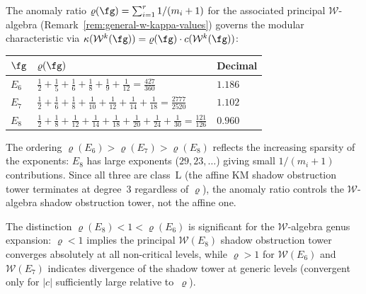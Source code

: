 \begin{remark}%
\label{rem:exceptional-anomaly-ratio}
The anomaly ratio
$\varrho(\fg) = \sum_{i=1}^r 1/(m_i + 1)$
for the associated principal $\mathcal{W}$-algebra
(Remark~\textup{\ref{rem:general-w-kappa-values}})
governs the modular characteristic via
$\kappa(\mathcal{W}^k(\fg)) = \varrho(\fg) \cdot c(\mathcal{W}^k(\fg))$:
\begin{center}
\renewcommand{\arraystretch}{1.3}
\begin{tabular}{lll}
\toprule
$\fg$ & $\varrho(\fg)$ & Decimal \\
\midrule
$E_6$ & $\displaystyle\frac{1}{2} + \frac{1}{5} + \frac{1}{6}
 + \frac{1}{8} + \frac{1}{9} + \frac{1}{12}
 = \frac{427}{360}$ & $1.186$ \\[6pt]
$E_7$ & $\displaystyle\frac{1}{2} + \frac{1}{6} + \frac{1}{8}
 + \frac{1}{10} + \frac{1}{12} + \frac{1}{14} + \frac{1}{18}
 = \frac{2777}{2520}$ & $1.102$ \\[6pt]
$E_8$ & $\displaystyle\frac{1}{2} + \frac{1}{8} + \frac{1}{12}
 + \frac{1}{14} + \frac{1}{18} + \frac{1}{20} + \frac{1}{24}
 + \frac{1}{30}
 = \frac{121}{126}$ & $0.960$ \\
\bottomrule
\end{tabular}
\end{center}
The ordering $\varrho(E_6) > \varrho(E_7) > \varrho(E_8)$
reflects the increasing sparsity of the exponents: $E_8$
has large exponents ($29, 23, \ldots$) giving small
$1/(m_i + 1)$ contributions. Since all three are class~L
(the affine KM shadow obstruction tower terminates at degree~3 regardless
of $\varrho$), the anomaly ratio controls the
$\mathcal{W}$-algebra shadow obstruction tower, not the affine one.

The distinction $\varrho(E_8) < 1 < \varrho(E_6)$ is
significant for the $\mathcal{W}$-algebra genus expansion:
$\varrho < 1$ implies the principal $\mathcal{W}(E_8)$
shadow obstruction tower converges absolutely at all non-critical
levels, while $\varrho > 1$ for $\mathcal{W}(E_6)$
and $\mathcal{W}(E_7)$ indicates divergence of the shadow
tower at generic levels (convergent only for
$|c|$ sufficiently large relative to~$\varrho$).
\end{remark}


